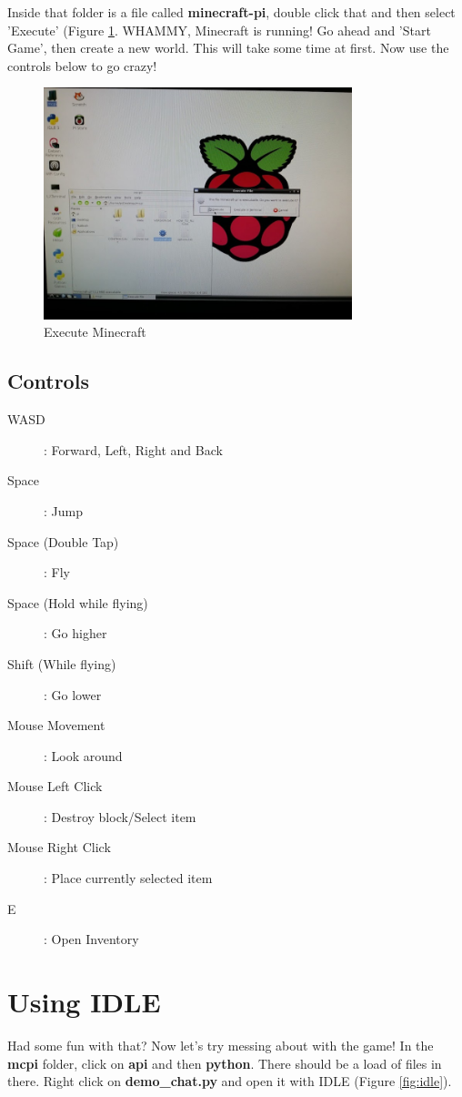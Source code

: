 \documentclass[]{paper}
\begin{document}
Inside that folder is a file called \textbf{minecraft-pi}, double click that and then select 'Execute' (Figure \ref{fig:mc}. WHAMMY, Minecraft is running! Go ahead and 'Start Game', then create a new world. This will take some time at first. Now use the controls below to go crazy!

\begin{figure}[H]
    \centering
    \includegraphics[width=0.8\textwidth]{figures/run-mc.jpg}
    \caption{Execute Minecraft}
    \label{fig:mc}
\end{figure}


\subsection*{Controls}
\begin{description}
	\item[WASD]: Forward, Left, Right and Back
	\item[Space]: Jump
	\item[Space (Double Tap)]: Fly
	\item[Space (Hold while flying)]: Go higher
	\item[Shift (While flying)]: Go lower
	\item[Mouse Movement]: Look around
	\item[Mouse Left Click]: Destroy block/Select item
	\item[Mouse Right Click]: Place currently selected item
	\item[E]: Open Inventory
\end{description}

\section{Using IDLE}
Had some fun with that? Now let's try messing about with the game! In the \textbf{mcpi} folder, click on \textbf{api} and then \textbf{python}. There should be a load of files in there. Right click on \textbf{demo\_chat.py} and open it with IDLE (Figure \ref{fig:idle}).
\end{document}
